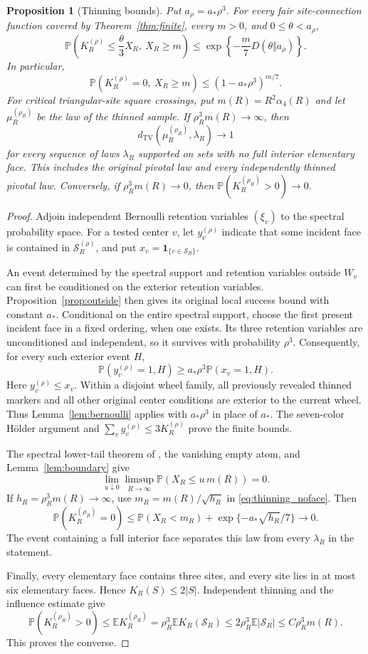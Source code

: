\documentclass[11pt]{amsart}
\newtheorem{proposition}[theorem]{Proposition}
\theoremstyle{remark}
\newcommand{\Prob}{\mathbb P}
\newcommand{\E}{\mathbb E}
\newcommand{\one}{\mathbf 1}
\newcommand{\cS}{\mathcal S}
\newcommand{\TV}{d_{\mathrm{TV}}}
\newcommand{\astar}{a_*}
\begin{document}
\begin{proposition}[Thinning bounds]\label{prop:thinning}
Put $a_\rho=\astar\rho^3$. For every fair site-connection function covered by Theorem~\ref{thm:finite}, every $m>0$, and $0\le\theta<a_\rho$,
\[
 \Prob\left(K_R^{(\rho)}\le\frac\theta3X_R,\ X_R\ge m\right)
 \le\exp\left\{-\frac m7D(\theta\Vert a_\rho)\right\}.
\]
In particular,
\begin{equation}\label{eq:thinning_noface}
 \Prob(K_R^{(\rho)}=0,\ X_R\ge m)\le(1-\astar\rho^3)^{m/7}.
\end{equation}
For critical triangular-site square crossings, put $m(R)=R^2\alpha_4(R)$ and let $\mu_R^{(\rho_R)}$ be the law of the thinned sample. If $\rho_R^3m(R)\to\infty$, then
\[
 \TV(\mu_R^{(\rho_R)},\lambda_R)\longrightarrow1
\]
for every sequence of laws $\lambda_R$ supported on sets with no full interior elementary face. This includes the original pivotal law and every independently thinned pivotal law. Conversely, if $\rho_R^3m(R)\to0$, then $\Prob(K_R^{(\rho_R)}>0)\to0$.
\end{proposition}
\begin{proof}
Adjoin independent Bernoulli retention variables $(\xi_v)$ to the spectral probability space. For a tested center $v$, let $y_v^{(\rho)}$ indicate that some incident face is contained in $\cS_R^{(\rho)}$, and put $x_v=\one_{\{v\in\cS_R\}}$.

An event determined by the spectral support and retention variables outside $W_v$ can first be conditioned on the exterior retention variables. Proposition~\ref{prop:outside} then gives its original local success bound with constant $\astar$. Conditional on the entire spectral support, choose the first present incident face in a fixed ordering, when one exists. Its three retention variables are unconditioned and independent, so it survives with probability $\rho^3$. Consequently, for every such exterior event $H$,
\[
 \Prob(y_v^{(\rho)}=1,H)\ge\astar\rho^3\Prob(x_v=1,H).
\]
Here $y_v^{(\rho)}\le x_v$. Within a disjoint wheel family, all previously revealed thinned markers and all other original center conditions are exterior to the current wheel. Thus Lemma~\ref{lem:bernoulli} applies with $\astar\rho^3$ in place of $\astar$. The seven-color H\"older argument and $\sum_v y_v^{(\rho)}\le3K_R^{(\rho)}$ prove the finite bounds.

The spectral lower-tail theorem of \cite[Theorem~1.1]{GPS}, the vanishing empty atom, and Lemma~\ref{lem:boundary} give
\[
 \lim_{u\downarrow0}\limsup_{R\to\infty}\Prob(X_R\le u\,m(R))=0.
\]
If $h_R=\rho_R^3m(R)\to\infty$, use $m_R=m(R)/\sqrt{h_R}$ in \eqref{eq:thinning_noface}. Then
\[
 \Prob(K_R^{(\rho_R)}=0)
 \le\Prob(X_R<m_R)+\exp\{-\astar\sqrt{h_R}/7\}\longrightarrow0.
\]
The event containing a full interior face separates this law from every $\lambda_R$ in the statement.

Finally, every elementary face contains three sites, and every site lies in at most six elementary faces. Hence $K_R(S)\le2|S|$. Independent thinning and the influence estimate give
\[
 \Prob(K_R^{(\rho_R)}>0)\le\E K_R^{(\rho_R)}
 =\rho_R^3\E K_R(\cS_R)\le2\rho_R^3\E|\cS_R|
 \le C\rho_R^3m(R).
\]
This proves the converse.
\end{proof}
\end{document}
